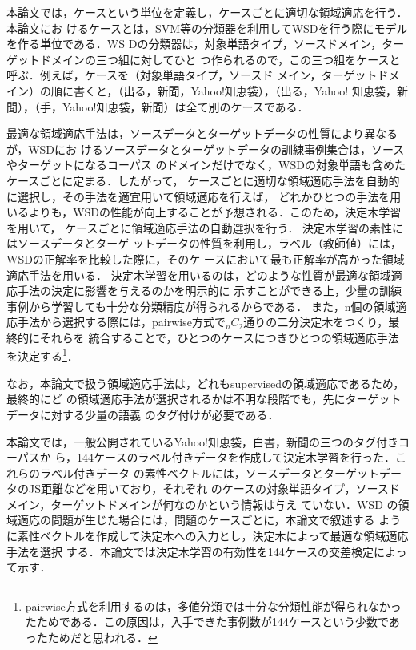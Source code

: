 \documentclass[japanese]{jnlp_1.4}
\begin{document}
本論文では，ケースという単位を定義し，ケースごとに適切な領域適応を行う．本論文にお
けるケースとは，SVM等の分類器を利用してWSDを行う際にモデルを作る単位である．WS
Dの分類器は，対象単語タイプ，ソースドメイン，ターゲットドメインの三つ組に対してひと
つ作られるので，この三つ組をケースと呼ぶ．例えば，ケースを（対象単語タイプ，ソースド
メイン，ターゲットドメイン）の順に書くと，（出る，新聞，Yahoo!知恵袋），（出る，Yahoo!
知恵袋，新聞），（手，Yahoo!知恵袋，新聞）は全て別のケースである．


最適な領域適応手法は，ソースデータとターゲットデータの性質により異なるが，WSDにお
けるソースデータとターゲットデータの訓練事例集合は，ソースやターゲットになるコーパス
のドメインだけでなく，WSDの対象単語も含めたケースごとに定まる．したがって，
ケースごとに適切な領域適応手法を自動的に選択し，その手法を適宜用いて領域適応を行えば，
どれかひとつの手法を用いるよりも，WSDの性能が向上することが予想される．このため，決定木学習を用いて，
ケースごとに領域適応手法の自動選択を行う．
決定木学習の素性にはソースデータとターゲ
ットデータの性質を利用し，ラベル（教師値）には，WSDの正解率を比較した際に，そのケ
ースにおいて最も正解率が高かった領域適応手法を用いる．
決定木学習を用いるのは，どのような性質が最適な領域適応手法の決定に影響を与えるのかを明示的に
示すことができる上，少量の訓練事例から学習しても十分な分類精度が得られるからである．
また，n個の領域適応手法から選択する際には，pairwise方式で$_{n}C_{2}$通りの二分決定木をつくり，最終的にそれらを
統合することで，ひとつのケースにつきひとつの領域適応手法を決定する\footnote{
	pairwise方式を利用するのは，多値分類では十分な分類性能が得られなかったためである．この原因は，入手できた事例数が144ケースという少数であったためだと思われる．}．

なお，本論文で扱う領域適応手法は，どれもsupervisedの領域適応であるため，最終的にど
の領域適応手法が選択されるかは不明な段階でも，先にターゲットデータに対する少量の語義
のタグ付けが必要である．

本論文では，一般公開されているYahoo!知恵袋，白書，新聞の三つのタグ付きコーパスか
ら，144ケースのラベル付きデータを作成して決定木学習を行った．これらのラベル付きデータ
の素性ベクトルには，ソースデータとターゲットデータのJS距離などを用いており，それぞれ
のケースの対象単語タイプ，ソースドメイン，ターゲットドメインが何なのかという情報は与え
ていない．WSD の領域適応の問題が生じた場合には，問題のケースごとに，本論文で叙述する
ように素性ベクトルを作成して決定木への入力とし，決定木によって最適な領域適応手法を選択
する．本論文では決定木学習の有効性を144ケースの交差検定によって示す．
\end{document}
